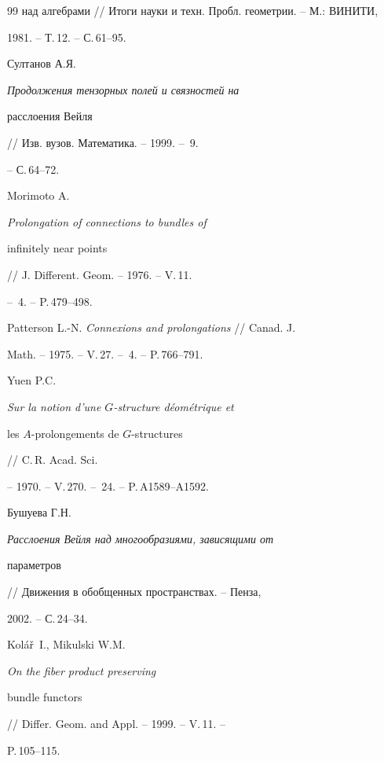 \begin{thebibliography}{99}
{над алгебрами} // Итоги науки и техн. Пробл. геометрии. -- М.: ВИНИТИ,


1981. -- Т.\,12. -- С.\,61--95.







Султанов А.Я. {\it Продолжения тензорных полей и связностей на


расслоения Вейля} // Изв. вузов. Математика. -- 1999. -- \No\,9.


-- С.\,64--72.







Morimoto A. {\it Prolongation of connections to bundles of


infinitely near points} // J. Different. Geom. -- 1976. -- V.\,11.


-- \No\,4. -- P.\,479--498.







Patterson L.-N. {\it Connexions and prolongations} // Canad. J.


Math. -- 1975. -- V.\,27. -- \No\,4. -- P.\,766--791.







Yuen P.C. {\it Sur la notion d'une $G$-structure d\'eom\'etrique et


les $A$-prolongements de $G$-structures} // C.\,R. Acad. Sci.


-- 1970. -- V.\,270. -- \No\,24. -- P.\,A1589--A1592.







Бушуева Г.Н. {\it Расслоения Вейля над многообразиями, зависящими от


параметров} // Движения в обобщенных пространствах. -- Пенза,


2002. -- С.\,24--34.







Kol\'{a}\v{r}~I., Mikulski W.M. {\it On the fiber product preserving


bundle functors} // Differ. Geom. and Appl. -- 1999. -- V.\,11. --


P.\,105--115.






\end{thebibliography}

